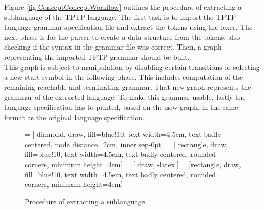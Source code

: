 Figure \ref{fig:ConceptConceptWorkflow} outlines the procedure of extracting a sublanguage of the \ac{TPTP} language. The first task is to import the \ac{TPTP} language grammar specification file and extract the tokens using the lexer. The next phase is for the parser to create a data structure from the tokens, also checking if the syntax in the grammar file was correct. Then, a graph representing the imported \ac{TPTP} grammar should be built.\\
This graph is subject to manipulation by disabling certain transitions or selecting a new start symbol in the following phase. This includes computation of the remaining reachable and terminating grammar. That new graph represents the grammar of the extracted language. To make this grammar usable, lastly the language specification has to printed, based on the new graph, in the same format as the original language specification.
\begin{figure}[H]
 = [ diamond, draw, fill=blue!10, text width=4.5em, text badly centered, node distance=2cm, inner sep-0pt]  
 = [ rectangle, draw, fill=blue!10, text width=4.5em, text badly centered, rounded corners, minimum height=4em]  
 = [ draw, -latex']  
 = [rectangle, draw, fill=blue!10, text width=4.5em, text badly centered, rounded corners, minimum height=4em]  
\begin{center}
\end{center}
\caption{Procedure of extracting a sublanguage}
\label{fig:ConceptWorkflow}
\end{figure}

